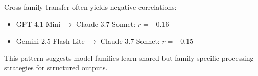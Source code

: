 \documentclass{article}
\begin{document}
Cross-family transfer often yields negative correlations:
\begin{itemize}[itemsep=1pt, parsep=0pt]
\item GPT-4.1-Mini $\to$ Claude-3.7-Sonnet: $r = -0.16$
\item Gemini-2.5-Flash-Lite $\to$ Claude-3.7-Sonnet: $r = -0.15$
\end{itemize}

This pattern suggests model families learn shared but family-specific processing strategies for structured outputs.
\end{document}

